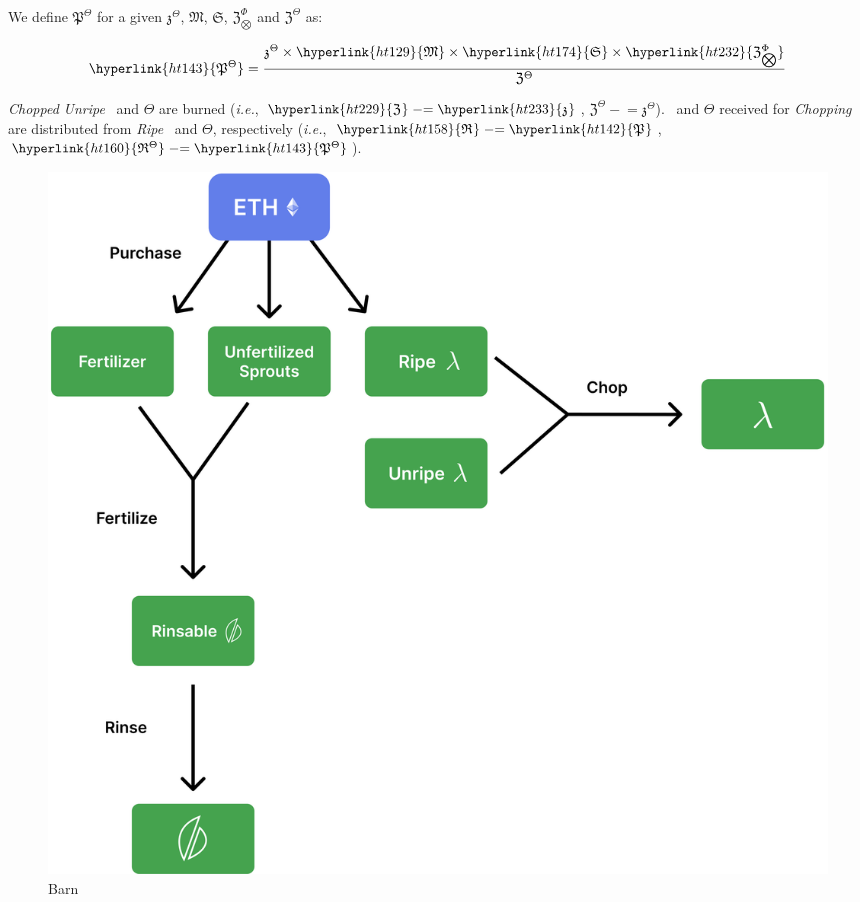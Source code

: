 \documentclass[tikz]{article}
\newcommand{\term}[1]{\textsl{#1}}
\newcommand{\Bean}{} %
\newcommand{\bean}{} %
\begin{document}
We define \hyperlink{ht143}{$\mathfrak{P}^{\Theta}$} for a given $\mathfrak{z}^{\Theta}$, \hyperlink{ht129}{$\mathfrak{M}$}, \hyperlink{ht174}{$\mathfrak{S}$}, \hyperlink{ht232}{$\mathfrak{Z}_{\bigotimes}^{\Phi}$} and $\mathfrak{Z}^{\Theta}$ as:

    $$
        \hyperlink{ht143}{\mathfrak{P}^{\Theta}} = 
            \frac{\mathfrak{z}^{\Theta} \times 
                    \hyperlink{ht129}{\mathfrak{M}} \times 
                    \hyperlink{ht174}{\mathfrak{S}} \times 
                    \hyperlink{ht232}{\mathfrak{Z}_{\bigotimes}^{\Phi}}}
                {\mathfrak{Z}^{\Theta}}
    $$

\term{Chopped} \term{Unripe} \Bean\ and $\Theta$ are burned (\term{i.e.}, $\hyperlink{ht229}{\mathfrak{Z}^{\bean}} \mathrel{-}= \hyperlink{ht233}{\mathfrak{z}^{\bean}}$, $\mathfrak{Z}^{\Theta} \mathrel{-}= \mathfrak{z}^{\Theta}$). \Bean\ and $\Theta$ received for \term{Chopping} are distributed from \term{Ripe} \Bean\ and $\Theta$, respectively (\term{i.e.}, $\hyperlink{ht158}{\mathfrak{R}^{\bean}} \mathrel{-}= \hyperlink{ht142}{\mathfrak{P}^{\bean}}$, $\hyperlink{ht160}{\mathfrak{R}^{\Theta}} \mathrel{-}= \hyperlink{ht143}{\mathfrak{P}^{\Theta}}$).

\vspace*{5mm}

\begin{figure}[h!]
    \centering
    \includegraphics[scale=.05]{./figures/Figure3} %
    \caption{Barn}
    \label{fig 3}
\end{figure}
\end{document}
